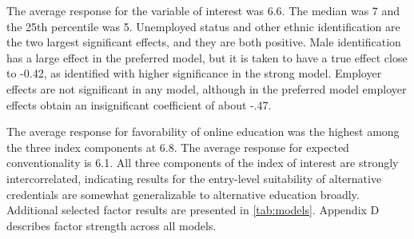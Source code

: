 \documentclass[review]{elsarticle}
\begin{document}
        The average response for the variable of interest was 6.6.
        The median was 7 and the 25th percentile was 5.
        Unemployed status and other ethnic identification are the two largest significant effects,
        and they are both positive.
        Male identification has a large effect in the preferred model, but it is taken to have a true
        effect close to -0.42,
        as identified with higher significance in the strong model.
        Employer effects are not significant in any model, although in the preferred
        model employer effects obtain an insignificant coefficient of about -.47.

        The average response for favorability of online education was the highest among the three
        index components at 6.8.
        The average response for expected conventionality is 6.1.
        All three components of the index of interest are strongly intercorrelated,
        indicating results for the entry-level suitability of alternative credentials
        are somewhat generalizable to alternative education broadly.
        Additional selected factor results are presented in \ref{tab:models}.
        Appendix D describes factor strength across all models.
        
\end{document}
